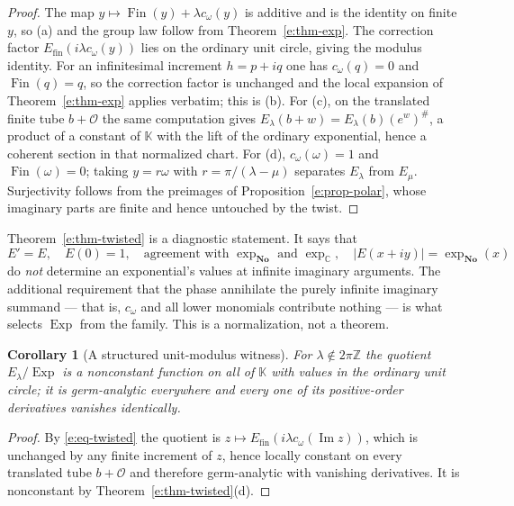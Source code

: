 \documentclass[11pt,a4paper]{article}
\numberwithin{equation}{section}
\newtheorem{corollary}[theorem]{Corollary}
\theoremstyle{definition}
\theoremstyle{remark}
\theoremstyle{plain}
\newcommand{\K}{\mathbb K}
\newcommand{\No}{\mathbf{No}}
\newcommand{\CC}{\mathbb C}
\newcommand{\ZZ}{\mathbb Z}
\newcommand{\Ov}{\mathcal O}
\DeclareMathOperator{\Exp}{Exp}
\newcommand{\ev}[1]{#1^{\#}}
\newcommand{\abs}[1]{\lvert #1\rvert}
\begin{document}
\begin{proof}
The map $y\mapsto\operatorname{Fin}(y)+\lambda c_\omega(y)$ is additive and
is the identity on finite $y$, so (a) and the group law follow from
Theorem~\ref{e:thm-exp}.  The correction factor
$E_{\mathrm{fin}}(i\lambda c_\omega(y))$ lies on the ordinary unit circle,
giving the modulus identity.  For an infinitesimal increment $h=p+iq$ one
has $c_\omega(q)=0$ and $\operatorname{Fin}(q)=q$, so the correction factor
is unchanged and the local expansion of Theorem~\ref{e:thm-exp} applies
verbatim; this is (b).  For (c), on the translated finite tube $b+\Ov$ the
same computation gives $E_\lambda(b+w)=E_\lambda(b)\ev{(e^w)}$, a product
of a constant of $\K$ with the lift of the ordinary exponential, hence a
coherent section in that normalized chart.  For (d), $c_\omega(\omega)=1$
and $\operatorname{Fin}(\omega)=0$; taking $y=r\omega$ with
$r=\pi/(\lambda-\mu)$ separates $E_\lambda$ from $E_\mu$.  Surjectivity
follows from the preimages of
Proposition~\ref{e:prop-polar}, whose imaginary parts are finite and hence
untouched by the twist.
\end{proof}

Theorem~\ref{e:thm-twisted} is a diagnostic statement.  It says that
\[
 E'=E,\quad E(0)=1,\quad
 \text{agreement with }\exp_{\No}\text{ and }\exp_{\CC},\quad
 \abs{E(x+iy)}=\exp_{\No}(x)
\]
do \emph{not} determine an exponential's values at infinite imaginary
arguments.  The additional requirement that the phase annihilate the
purely infinite imaginary summand --- that is,
$c_\omega$ and all lower monomials contribute nothing --- is what selects
$\Exp$ from the family.  This is a normalization, not a theorem.

\begin{corollary}[A structured unit-modulus witness]\label{e:cor-twistwitness}
For $\lambda\notin2\pi\ZZ$ the quotient $E_\lambda/\Exp$ is a nonconstant
function on all of $\K$ with values in the ordinary unit circle; it is
germ-analytic everywhere and every one of its positive-order derivatives
vanishes identically.
\end{corollary}

\begin{proof}
By \eqref{e:eq-twisted} the quotient is
$z\mapsto E_{\mathrm{fin}}(i\lambda c_\omega(\operatorname{Im}z))$, which
is unchanged by any finite increment of $z$, hence locally constant on
every translated tube $b+\Ov$ and therefore germ-analytic with vanishing
derivatives.  It is nonconstant by
Theorem~\ref{e:thm-twisted}(d).
\end{proof}
\end{document}
